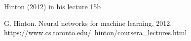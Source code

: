 Hinton (2012) in his lecture 15b

G. Hinton. Neural networks for machine learning, 2012.
https://www.cs.toronto.edu/~hinton/coursera_lectures.html
